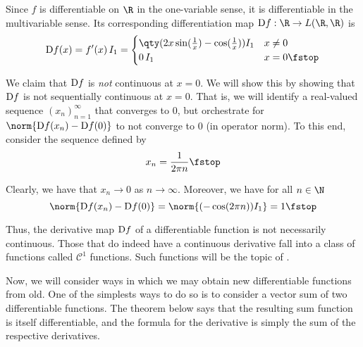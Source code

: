 Since \( f \) is differentiable on \( \R \) in the one-variable sense, it is differentiable in the multivariable sense. Its corresponding differentiation map \( \D f:\R\to L(\R,\R) \) is
\[ \D f(x)=f'(x)\,I_1=
  \begin{cases}
    \qty(2x\sin(\frac{1}{x})-\cos(\frac{1}{x}))I_1 &x\neq 0\\
    0\, I_1 &x=0\fstop
  \end{cases}
\]

We claim that \( \text{D} f \) is \emph{not} continuous at \( x=0 \). We will show this by showing that \( \text{D} f \) is not sequentially continuous at \( x=0 \). That is, we will identify a real-valued sequence \( (x_n)_{n=1}^\infty \) that converges to 0, but orchestrate for \( \norm{\D f(x_n)-\D f(0)} \) to not converge to 0 (in operator norm). To this end, consider the sequence defined by
\[ x_n=\frac{1}{2\pi n}\fstop \]

Clearly, we have that \( x_n\to 0 \) as \( n\to\infty \). Moreover, we have for all \( n\in\N \)
\[ \norm{\D f(x_n)-\D f(0)}=\norm{(-\cos(2\pi n))I_1}=1\fstop \]

Thus, the derivative map \( \text{D} f \) of a differentiable function is not necessarily continuous. Those that do indeed have a continuous derivative fall into a class of functions called \( \mathcal{C}^1 \) functions. Such functions will be the topic of .

\vspace{3mm}

Now, we will consider ways in which we may obtain new differentiable functions from old. One of the simplests ways to do so is to consider a vector sum of two differentiable functions. The theorem below says that the resulting sum function is itself differentiable, and the formula for the derivative is simply the sum of the respective derivatives.

